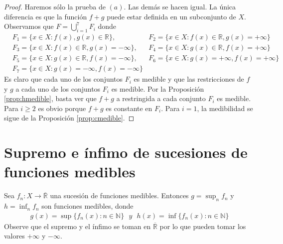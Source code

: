 \begin{proof}
Haremos sólo la prueba de $(a)$. Las demás se hacen igual. La única diferencia es que la función $f+g$ puede estar definida en un subconjunto de $X$. Observamos que $F = \bigcup_{i=1}^{7}{F_i}$ donde
\begin{align*}
    &F_1 = \{ x \in X : f(x),g(x) \in \mathbb{R} \},  &F_2 = \{x \in X :f(x) \in \mathbb{R}, g(x) = +\infty \}\\
    &F_3 = \{x \in X :f(x) \in \mathbb{R}, g(x) = -\infty \},  &F_4 = \{x \in X :g(x) \in \mathbb{R}, f(x) = +\infty \}\\
    &F_5 = \{x \in X :g(x) \in \mathbb{R}, f(x) = -\infty \},  &F_6 = \{x \in X :g(x) = +\infty , f(x) = +\infty \}\\
    &F_7 = \{x \in X :g(x) = -\infty , f(x) = -\infty \}
\end{align*}
Es claro que cada uno de los conjuntos $F_i$ es medible y que las restricciones de $f$ y $g$ a cada uno de los conjuntos $F_i$ es medible. Por la Proposición \ref{prop:hmedible}, basta ver que $f+g$ a restringida a cada conjunto $F_i$ es medible. Para $i \ge 2$ es obvio porque $f+g$ es constante en $F_i$. Para $i = 1$, la medibilidad se sigue de la Proposición \ref{prop:cmedible}.
\end{proof}

\section{Supremo e ínfimo de sucesiones de funciones medibles}

\begin{prop}
\label{prop:sup}
Sea $f_n: X \longrightarrow \overline{\mathbb{R}}$ una sucesión de funciones medibles. Entonces $g = \sup_n{f_n}$ y $h = \inf_n{f_n}$ son funciones medibles, donde
\begin{align*}
    g(x) = \sup{\{ f_n(x) : n \in \mathbb{N}\}} \ \ \ y  \ \ \ h(x) = \inf{\{ f_n(x) : n \in \mathbb{N}\}}
\end{align*}
Observe que el supremo y el ínfimo se toman en $\overline{\mathbb{R}}$ por lo que pueden tomar los valores $+\infty$ y $-\infty$.
\end{prop}

